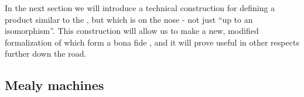 In the next section we will introduce a technical construction for defining a product similar to the , but which is  on the nose - not just ``up to an isomorphism''.
This construction will allow us to make a new, modified formalization of  which form a bona fide , and it will prove useful in other respects further down the road.



\subsection{Mealy machines}


